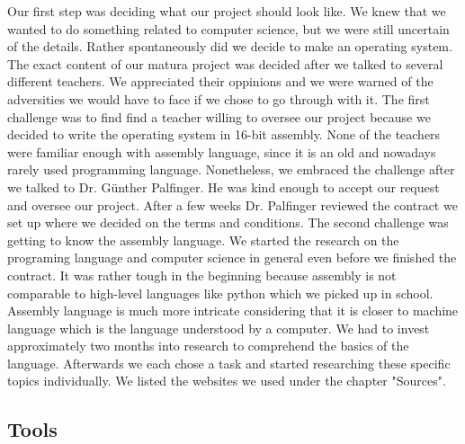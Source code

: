 \documentclass{article}
\begin{document}
Our first step was deciding what our project should look like. We knew that we wanted to do something related to computer science, but we were still uncertain of the details. 
Rather spontaneously did we decide to make an operating system. The exact content of our matura project was decided after we talked to several different teachers. We 
appreciated their oppinions and we were warned of the adversities we would have to face if we chose to go through with it. The first challenge was to find find a teacher 
willing to oversee our project because we decided to write the operating system in 16-bit assembly. None of the teachers were familiar enough with assembly language, since
it is an old and nowadays rarely used programming language. Nonetheless, we embraced the challenge after we talked to Dr. Günther Palfinger. He was kind enough to accept our 
request and oversee our project. After a few weeks Dr. Palfinger reviewed the contract we set up where we decided on the terms and conditions. The second challenge was 
getting to know the assembly language. We started the research on the programing language and computer science in general even before we finished the contract. It was rather
tough in the beginning because assembly is not comparable to high-level languages like python which we picked up in school. Assembly language is much more intricate considering 
that it is closer to machine language which is the language understood by a computer. We had to invest approximately two months into research to comprehend the basics
of the language. Afterwards we each chose a task and started researching these specific topics individually. We listed the websites we used under the chapter "Sources".

\subsection{Tools}
\end{document}

